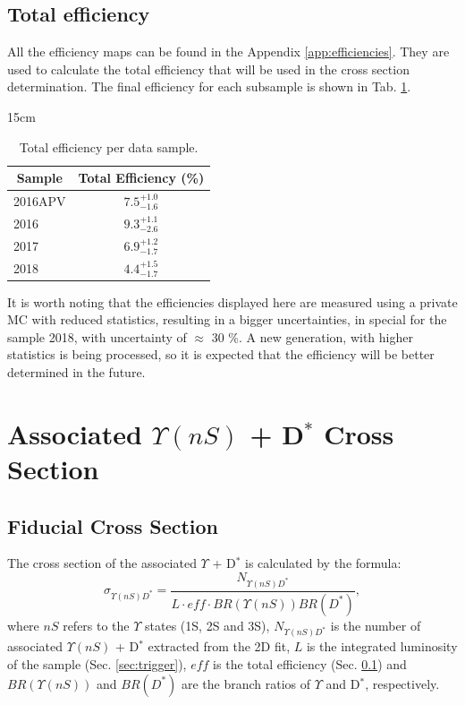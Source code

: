\subsection{Total efficiency}\label{sec:total_eff}

All the efficiency maps can be found in the Appendix \ref{app:efficiencies}. They are used to calculate the total efficiency that will be used in the cross section determination. The final efficiency for each subsample is shown in Tab. \ref{tab:totaleff}.

\begin{table}[!htbp]{15cm}
  \caption{Total efficiency per data sample.}
  \begin{tabular}{ l | c }
    \hline
    \multicolumn{1}{c|}{Sample} & \multicolumn{1}{c}{Total Efficiency (\%)} \\ \hline
    2016APV                     & $7.5^{+1.0}_{-1.6}$                       \\ \hline
    2016                        & $9.3^{+1.1}_{-2.6}$                       \\ \hline
    2017                        & $6.9^{+1.2}_{-1.7}$                       \\ \hline
    2018                        & $4.4^{+1.5}_{-1.7}$                       \\ \hline
  \end{tabular}
  \label{tab:totaleff}
\end{table}

It is worth noting that the efficiencies displayed here are measured using a private MC with reduced statistics, resulting in a bigger uncertainties, in special for the sample 2018, with uncertainty of $\approx$ 30 \%. A new generation, with higher statistics is being processed, so it is expected that the efficiency will be better determined in the future.

\section{Associated \texorpdfstring{$\Upsilon(nS)$ + D$^{*}$}{Y+D*} Cross Section}

\subsection{Fiducial Cross Section} \label{subsec:fiducial_xsec}

The cross section of the associated $\Upsilon$ + D$^{*}$ is calculated by the formula:
\begin{equation}
  \sigma_{\Upsilon(nS) D^*} = \frac{N_{\Upsilon(nS) D^*}}{L\cdot eff \cdot BR(\Upsilon(nS))BR(D^*)},
\end{equation}
where $nS$ refers to the $\Upsilon$ states (1S, 2S and 3S), $N_{\Upsilon(nS) D^*}$ is the number of associated $\Upsilon(nS)$ + D$^*$ extracted from the 2D fit, $L$ is the integrated luminosity of the sample (Sec. \ref{sec:trigger}), $eff$ is the total efficiency (Sec. \ref{sec:total_eff}) and $BR(\Upsilon(nS))$ and $BR(D^*)$ are the branch ratios of $\Upsilon$ and D$^*$, respectively.

